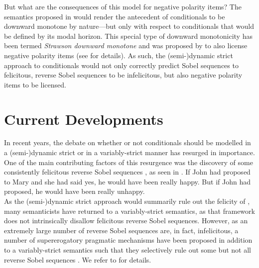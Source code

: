 But what are the consequences of this model for negative polarity items? The semantics proposed in  would render the antecedent of conditionals to be downward monotone by nature---but only with respect to conditionals that would be defined by its modal horizon. This special type of downward monotonicity has been termed \textit{Strawson downward monotone} and was proposed by \textcite{Fintel1999} to also license negative polarity items (see  for details). As such, the (semi-)dynamic strict approach to conditionals would not only correctly predict Sobel sequences to felicitous, reverse Sobel sequences to be infelicitous, but also negative polarity items to be licensed.


\section{Current Developments}
In recent years, the debate on whether or not conditionals should be modelled in a (semi-)dynamic strict or in a variably-strict manner has resurged in importance. One of the main contributing factors of this resurgence was the discovery of some consistently felicitous reverse Sobel sequences \parencite{Moss2012}, as seen in .
\pex{}\label{ex:moss-intro}
\a{} If John had proposed to Mary and she had said yes, he would have been really happy.
\a{} But if John had proposed, he would have been really unhappy.\\\emptyfill\parencite[p.~577]{Moss2012}
\xe
As the (semi-)dynamic strict approach would summarily rule out the felicity of , many semanticists have returned to a variably-strict semantics, as that framework does not intrinsically disallow felicitous reverse Sobel sequences. However, as an extremely large number of reverse Sobel sequences are, in fact, infelicitous, a number of supererogatory pragmatic mechanisms have been proposed in addition to a variably-strict semantics such that they selectively rule out some but not all reverse Sobel sequences \parencite{Moss2012,Klecha2011,Klecha2014,Klecha2015,Lewis2018,Krassnig2017,Krassnig2020}. We refer to  for details.

